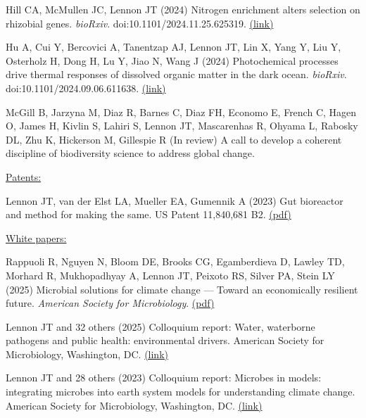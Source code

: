 \documentclass[11pt]{article}
\begin{document}
\begin{etaremune}
\item Hill CA, McMullen JC, Lennon JT (2024) Nitrogen enrichment alters selection on rhizobial genes. \textit{bioRxiv}. doi:10.1101/2024.11.25.625319. \href{https://www.biorxiv.org/content/10.1101/2024.11.25.625319v1.full.pdf}{(link)}

\item Hu A, Cui Y, Bercovici A, Tanentzap AJ, Lennon JT, Lin X, Yang Y, Liu Y, Osterholz H, Dong H, Lu Y, Jiao N, Wang J (2024) Photochemical processes drive thermal responses of dissolved organic matter in the dark ocean. \textit{bioRxiv}. doi:10.1101/2024.09.06.611638. \href{https://www.biorxiv.org/content/10.1101/2024.09.06.611638v1.full.pdf}{(link)}

\item McGill B, Jarzyna M, Diaz R, Barnes C, Diaz FH, Economo E, French C, Hagen O, James H, Kivlin S, Lahiri S, Lennon JT, Mascarenhas R, Ohyama L, Rabosky DL, Zhu K, Hickerson M, Gillespie R (In review) A call to develop a coherent discipline of biodiversity science to address global change.

\vspace{1em}
\item[] \textnormal{\underline{Patents:}}
\item Lennon JT, van der Elst LA, Mueller EA, Gumennik A (2023) Gut bioreactor and method for making the same. US Patent 11,840,681 B2. \href{https://lennonlab.github.io/assets/publications/Lennon_etal_2023b.pdf}{(pdf)}

\vspace{1em}
\item[] \textnormal{\underline{White papers:}}

\item Rappuoli R, Nguyen N, Bloom DE, Brooks CG, Egamberdieva D, Lawley TD, Morhard R, Mukhopadhyay A, Lennon JT, Peixoto RS, Silver PA, Stein LY (2025) Microbial solutions for climate change — Toward an economically resilient future. \textit{American Society for Microbiology}. \href{https://lennonlab.github.io/assets/publications/Rappuoli_etal_2025b.pdf}{(pdf)}

\item Lennon JT and 32 others (2025) Colloquium report: Water, waterborne
pathogens and public health: environmental drivers. American Society for Microbiology, Washington, DC. \href{https://asm.org/reports/water-waterborne-pathogens-and-public-health-envi}{(link)}

\item Lennon JT and 28 others (2023) Colloquium report: Microbes in models: integrating microbes into earth system models for understanding climate change. American Society for Microbiology, Washington, DC. \href{https://www.ncbi.nlm.nih.gov/books/NBK592518/}{(link)}


\end{etaremune}
\end{document}

